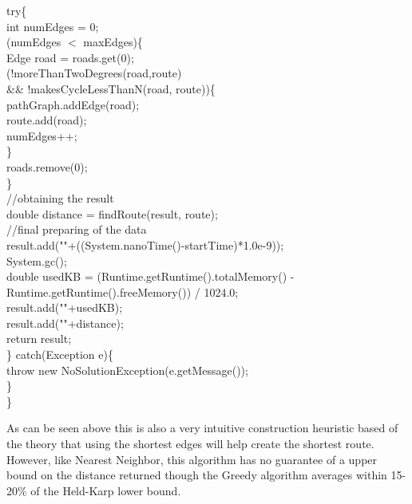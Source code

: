 \documentclass[midd]{thesis}
\newcommand{\tab}{\hspace*{2em}}
\begin{document}
\begin{codebox}
\tab try\{\\
\tab\tab int numEdges = 0;\\
\tab\tab\While(numEdges $<$ maxEdges)\{\\
\tab\tab\tab Edge road = roads.get(0);\\
\tab\tab\tab \If(!moreThanTwoDegrees(road,route)\\
\tab\tab\tab\tab \&\& !makesCycleLessThanN(road, route))\{\\
\tab\tab\tab\tab pathGraph.addEdge(road);\\
\tab\tab\tab\tab route.add(road);\\
\tab\tab\tab\tab numEdges++;\\
\tab\tab\tab\}\\\End
\tab\tab\tab roads.remove(0);\\
\tab\tab\}\\\End
\tab\tab //obtaining the result\\
\tab\tab double distance = findRoute(result, route);\\
\tab\tab //final preparing of the data\\
\tab\tab result.add(""+((System.nanoTime()-startTime)*1.0e-9));\\
\tab\tab System.gc();\\
\tab\tab double usedKB = (Runtime.getRuntime().totalMemory() - \\
\tab\tab\tab Runtime.getRuntime().freeMemory()) / 1024.0;\\
\tab\tab result.add(""+usedKB);\\
\tab\tab result.add(""+distance);\\
\tab\tab return result;\\
\tab\tab \} catch(Exception e)\{\\
\tab\tab\tab throw new NoSolutionException(e.getMessage());\\
\tab\tab\}\\
\}\\
\end{codebox}
\tab As can be seen above this is also a very intuitive construction heuristic based of the theory that using the shortest edges will help create the shortest route. However, like Nearest Neighbor, this algorithm has no guarantee of a upper bound on the distance returned though the Greedy algorithm averages within 15-20\% of the Held-Karp lower bound\cite{htspc}.\\
\end{document}
